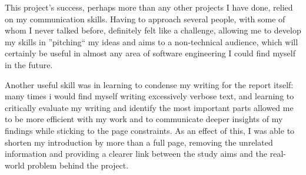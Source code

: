 \documentclass[12pt]{article}
\begin{document}
    This project's success, perhaps more than any other projects I have done, relied on my communication skills.
    Having to approach several people, with some of whom I never talked before, definitely felt like a challenge, allowing me to
    develop my skills in ''pitching`` my ideas and aims to a non-technical audience, which will certainly be useful in almost any area
    of software engineering I could find myself in the future.

    Another useful skill was in learning to condense my writing for the report itself: many times i would find myself
    writing excessively verbose text, and learning to critically evaluate my writing and identify the most important parts
    allowed me to be more efficient with my work and to communicate deeper insights of my findings while sticking to the page
    constraints.
    As an effect of this, I was able to shorten my introduction by more than a full page, removing the unrelated information and
    providing a clearer link between the study aims and the real-world problem behind the project.


    \vfill
    \textcolor{red}{\lipsum[1]}
\end{document}
